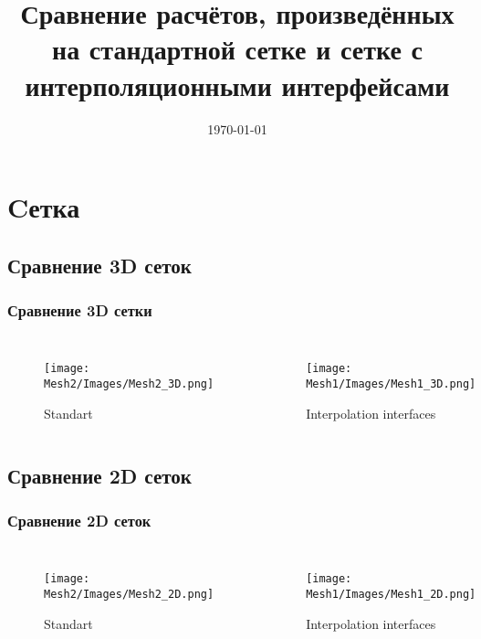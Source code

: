 \documentclass[c, aspectratio = 169]{beamer}
\title[ЦИАМ им. П.И. Баранова]{Сравнение расчётов, произведённых на стандартной сетке и сетке с интерполяционными интерфейсами}
\date{\today}
\begin{document}
    \frame[plain]{\titlepage}	
    \section{Cетка} 
    \subsection{Сравнение 3D сеток}
    
    \begin{frame}
        \frametitle{Сравнение 3D сетки}
        \begin{columns}[c]
            
            \vspace{-0.4cm}
            
                \begin{figure}
                    \texttt{[image: Mesh2/Images/Mesh2\_3D.png]}
                    \caption{Standart}  
                \end{figure}  
        
        
            \vspace{-0.8cm}
            
                \begin{figure}
                    \texttt{[image: Mesh1/Images/Mesh1\_3D.png]}
                    \caption{Interpolation interfaces}     
                \end{figure}  
        \end{columns}
        \end{frame}
     
    
        \subsection{Сравнение 2D сеток}
        \begin{frame}
        \frametitle{Сравнение 2D сеток}
        \vspace{-0.5cm}
        \begin{columns}[c] %
            \begin{figure}
                \texttt{[image: Mesh2/Images/Mesh2\_2D.png]}
                \vspace{-0.25cm}
                \caption{Standart}  
            \end{figure}  
            
            \vspace{-1.0cm}
            
            \begin{figure}
                \texttt{[image: Mesh1/Images/Mesh1\_2D.png]}
                \vspace{-0.25cm}
                \caption{Interpolation interfaces}     
            \end{figure}  
            
        \end{columns}
        \end{frame}
    
\end{document}
